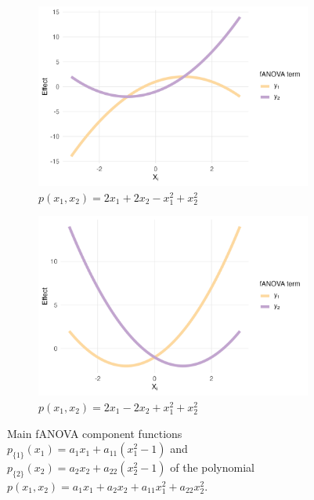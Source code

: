 \begin{figure}[htpb]
    \begin{subfigure}[t]{0.49\textwidth}
        \centering
        \includegraphics[width=\textwidth]{images/experiment_section/mixed_a1p20_a2p20_a11m10_a22p10_a12p00_rhop00_main.png}
        \caption{$p(x_1, x_2) = 2 x_1 + 2 x_2 - x_1^2 + x_2^2$}
        \label{fig:mixed_rho_0_panel3}
    \end{subfigure}%
    \hfill
    \begin{subfigure}[t]{0.49\textwidth}
        \centering
        \includegraphics[width=\textwidth]{images/experiment_section/mixed_a1p20_a2m20_a11p10_a22p10_a12p00_rhop00_main.png}
        \caption{$p(x_1, x_2) = 2 x_1 - 2 x_2 + x_1^2 + x_2^2$}
        \label{fig:mixed_rho_0_panel4}
    \end{subfigure}

    \caption{Main fANOVA component functions $p_{\{1\}}(x_1) = a_1 x_1 + a_{11}(x_1^2 - 1)$ and $p_{\{2\}}(x_2) = a_2 x_2 + a_{22}(x_2^2 - 1)$ of the polynomial $p(x_1, x_2) = a_1 x_1 + a_2 x_2 + a_{11} x_1^2 + a_{22} x_2^2$.}
    \label{fig:mixed_main_effects}
\end{figure}

